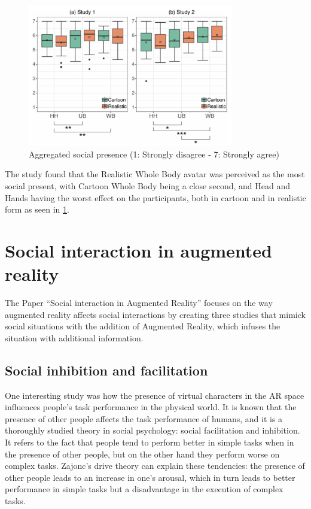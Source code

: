 \begin{figure}[H]
\centering
\includegraphics[width = 0.8\textwidth]{figures/Bildschirmfoto 2022-06-10 um 19.33.46}
\caption[Study 1 setup]{Aggregated social presence (1: Strongly disagree - 7: Strongly agree)}
\label{fig::avatarAppearences2}
\end{figure}


The study found that the Realistic Whole Body avatar was perceived as the most social present, with Cartoon Whole Body being a close second, and Head and Hands having the worst effect on the participants, both in cartoon and in realistic form as seen in \ref{fig::avatarAppearences2}.



\section{Social interaction in augmented reality}

The Paper “Social interaction in Augmented Reality” 
\cite{Carmigniani:2011te}
 focuses on the way augmented reality affects social interactions by creating three studies that mimick social situations with the addition of Augmented Reality, which infuses the situation with additional information. 

\subsection{Social inhibition and facilitation}
One interesting study was how the presence of virtual characters in the AR space influences people's task performance in the physical world. It is known that the presence of other people affects the task performance of humans, and it is a thoroughly studied theory in social psychology: social facilitation and inhibition. It refers to the fact that people tend to perform better in simple tasks when in the presence of other people, but on the other hand they perform worse on complex tasks. Zajonc’s drive theory can explain these tendencies: the presence of other people leads to an increase in one’s arousal, which in turn leads to better performance in simple tasks but a disadvantage in the execution of complex tasks.

